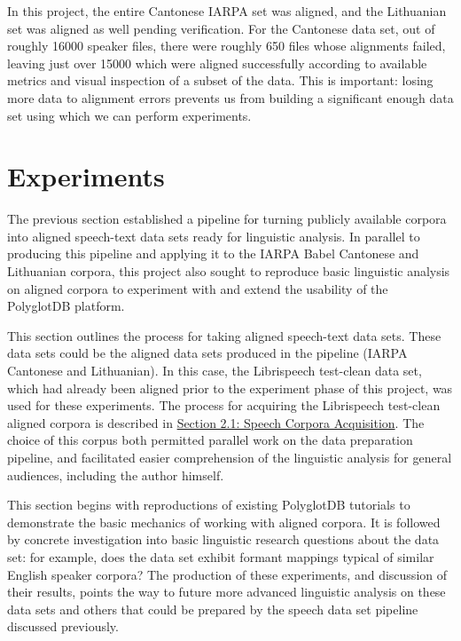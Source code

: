 \documentclass[11pt]{article}
\begin{document}
In this project, the entire Cantonese IARPA set was aligned, and the Lithuanian set was aligned as well pending verification. For the Cantonese data set, out of roughly 16000 speaker files, there were roughly 650 files whose alignments failed, leaving just over 15000 which were aligned successfully according to available metrics and visual inspection of a subset of the data. This is important: losing more data to alignment errors prevents us from building a significant enough data set using which we can perform experiments.

\section{Experiments}

The previous section established a pipeline for turning publicly available corpora into aligned speech-text data sets ready for linguistic analysis. In parallel to producing this pipeline and applying it to the IARPA Babel Cantonese and Lithuanian corpora, this project also sought to reproduce basic linguistic analysis on aligned corpora to experiment with and extend the usability of the PolyglotDB platform.

This section outlines the process for taking aligned speech-text data sets. These data sets could be the aligned data sets produced in the pipeline (IARPA Cantonese and Lithuanian). In this case, the Librispeech test-clean data set, which had already been aligned prior to the experiment phase of this project, was used for these experiments. The process for acquiring the Librispeech test-clean aligned corpora is described in \hyperlink{section.21}{Section 2.1: Speech Corpora Acquisition}. The choice of this corpus both permitted parallel work on the data preparation pipeline, and facilitated easier comprehension of the linguistic analysis for general audiences, including the author himself.

This section begins with reproductions of existing PolyglotDB tutorials to demonstrate the basic mechanics of working with aligned corpora. It is followed by concrete investigation into basic linguistic research questions about the data set: for example, does the data set exhibit formant mappings typical of similar English speaker corpora? The production of these experiments, and discussion of their results, points the way to future more advanced linguistic analysis on these data sets and others that could be prepared by the speech data set pipeline discussed previously.
\end{document}
